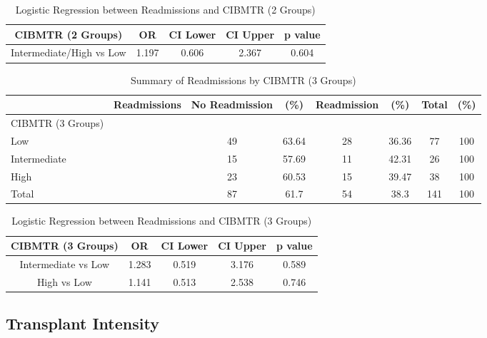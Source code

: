 \documentclass[12pt,]{article}
\begin{document}
\begin{table}[!h]

\caption{\label{tab:unnamed-chunk-43}Logistic Regression between Readmissions and CIBMTR (2 Groups)}
\centering
\begin{tabular}{ccccc}
\toprule
CIBMTR (2 Groups) & OR & CI Lower & CI Upper & p value\\
\midrule
\rowcolor{white}  Intermediate/High vs Low & 1.197 & 0.606 & 2.367 & 0.604\\
\bottomrule
\end{tabular}
\end{table}

\begin{table}[!h]

\caption{\label{tab:unnamed-chunk-43}Summary of Readmissions by CIBMTR (3 Groups)}
\centering
\begin{tabular}{>{\centering\arraybackslash}p{5cm}ccccccc}
\toprule
  & Readmissions & No Readmission & (\%) & Readmission & (\%) & Total & (\%)\\
\midrule
CIBMTR (3 Groups) &  &  &  &  &  &  & \\
\rowcolor[HTML]{E3E5E7}  Low &  & 49 & 63.64 & 28 & 36.36 & 77 & 100\\
Intermediate &  & 15 & 57.69 & 11 & 42.31 & 26 & 100\\
\rowcolor[HTML]{E3E5E7}  High &  & 23 & 60.53 & 15 & 39.47 & 38 & 100\\
Total &  & 87 & 61.7 & 54 & 38.3 & 141 & 100\\
\bottomrule
\end{tabular}
\end{table}

\begin{table}[!h]

\caption{\label{tab:unnamed-chunk-43}Logistic Regression between Readmissions and CIBMTR (3 Groups)}
\centering
\begin{tabular}{ccccc}
\toprule
CIBMTR (3 Groups) & OR & CI Lower & CI Upper & p value\\
\midrule
Intermediate vs Low & 1.283 & 0.519 & 3.176 & 0.589\\
\rowcolor[HTML]{E3E5E7}  High vs Low & 1.141 & 0.513 & 2.538 & 0.746\\
\bottomrule
\end{tabular}
\end{table}

\pagebreak

\subsection{Transplant Intensity}\label{transplant-intensity}
\end{document}
